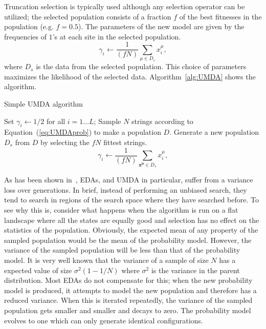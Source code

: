 \documentclass{acm_proc_article-sp}
\newcommand{\Ls}{L}
\newcommand{\Np}{N}
\newcommand{\p}{\gamma}
\begin{document}
Truncation selection is typically used 
although any selection operator can be utilized; the selected population consists of
a fraction $f$ of the best fitnesses in the population
(e.g. $f=0.5$). The parameters of the new model are given by the frequencies
of $1$'s at each site in the selected population.
\begin{equation}
  \label{eq:UMDA_learning}
\p_i \leftarrow \frac{1}{(f\Np)}{\sum_{\mu \in D_s} x_i^\mu },
\end{equation}
where $D_s$ is the data from the selected population. 
This choice of parameters maximizes the likelihood of the selected
data. 
Algorithm~\ref{alg:UMDA} shows the algorithm.
                                                                                
\begin{algorithm}
  \caption{Simple UMDA algorithm}
  \label{alg:UMDA}
   \begin{algorithmic}
    \STATE Set $\p_i\leftarrow 1/2$ for all $i=1 \ldots \Ls$;
    \REPEAT
      \STATE Sample $\Np$ strings according to Equation~(\ref{eq:UMDAprob}) to make a population $D$.
      \STATE Generate a new population $D_s$ from $D$ by selecting the
      $fN$ fittest strings.
      \FOR{$i=1$ to $\Ls$}
\STATE\begin{equation}
  \label{eq:pi}
\p_i \leftarrow \frac{1}{(f\Np)}{\sum_{\mathbf{x^\mu}\in D_s} x_i^\mu },
\end{equation}
\ENDFOR
{}
    \end{algorithmic}
\end{algorithm}

As has been shown in~\cite{Shapiro2005,Shapiro2006}, EDAs, and UMDA in
particular, suffer from a variance loss over generations. In brief,
instead of performing an unbiased search, they tend to search in
regions of the search space where they have searched before.  To see
why this is, consider what happens when the algorithm is run on a flat
landscape where all the states are equally good and selection has no
effect on the statistics of the population.  Obviously, the expected
mean of any property of the sampled population would be the mean of
the probability model. However, the variance of the sampled population
will be less than that of the probability model. It is very well known
that the variance of a sample of size $N$ has a expected value of size
$\sigma^2 (1-1/N)$ where $\sigma^2$ is the variance in the parent
distribution.  Most EDAs do not compensate for this; when the new
probability model is produced, it attempts to model the new population
and therefore has a reduced variance. When this is iterated
repeatedly, the variance of the sampled population gets smaller and
smaller and decays to zero. The probability model evolves to one which
can only generate identical configurations.
\end{document}
